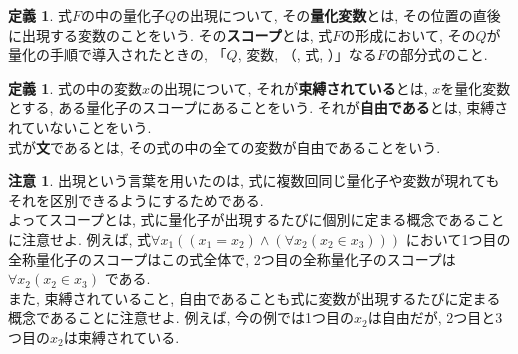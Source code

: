 \documentclass[a4paper]{bxjsarticle}
\theoremstyle{definition}
\newtheorem{defn}[thm]{定義}
\newtheorem{rem}[thm]{注意}
\begin{document}
    \begin{defn}
        式$F$の中の量化子$Q$の出現について, その\textbf{量化変数}とは, その位置の直後に出現する変数のことをいう.  その\textbf{スコープ}とは, 式$F$の形成において, その$Q$が量化の手順で導入されたときの, 「$Q$, 変数, （, 式, ）」なる$F$の部分式のこと.
    \end{defn}
    \begin{defn}
        式の中の変数$x$の出現について,  それが\textbf{束縛されている}とは, $x$を量化変数とする, ある量化子のスコープにあることをいう. それが\textbf{自由である}とは, 束縛されていないことをいう.\\
        式が\textbf{文}であるとは, その式の中の全ての変数が自由であることをいう.
    \end{defn}
    \begin{rem}
        出現という言葉を用いたのは, 式に複数回同じ量化子や変数が現れてもそれを区別できるようにするためである.\\
        よってスコープとは, 式に量化子が出現するたびに個別に定まる概念であることに注意せよ. 例えば, 式$\forall x_1 ((x_1=x_2) \land (\forall x_2 (x_2 \in x_3)))$ において1つ目の全称量化子のスコープはこの式全体で, 2つ目の全称量化子のスコープは$\forall x_2 (x_2 \in x_3)$ である.\\
        また, 束縛されていること, 自由であることも式に変数が出現するたびに定まる概念であることに注意せよ. 例えば, 今の例では1つ目の$x_2$は自由だが, 2つ目と3つ目の$x_2$は束縛されている.\\
    \end{rem}
\end{document}
